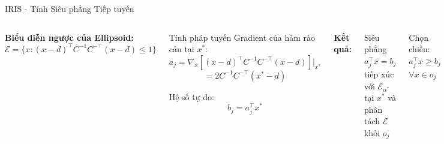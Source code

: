 \documentclass[aspectratio=169]{beamer}
\begin{document}
\begin{frame}{IRIS - Tính Siêu phẳng Tiếp tuyến}
    \begin{columns}[c]
        
        \textbf{Biểu diễn ngược của Ellipsoid:}
        \[
            \mathcal{E} = \{x : (x-d)^\top C^{-1}C^{-\top}(x-d) \leq 1\}
        \]

        \vspace{0.5em}
        \begin{block}{Tính pháp tuyến}
            \small
            Gradient của hàm rào cản tại $x^*$:
            \[
                a_j = \nabla_x[(x-d)^\top C^{-1}C^{-\top}(x-d)]|_{x^*}
            \]
            \[
                = 2C^{-1}C^{-\top}(x^* - d)
            \]
            
            Hệ số tự do:
            \[
                b_j = a_j^\top x^*
            \]
        \end{block}

        
        \vspace{0.5em}
        \textbf{Kết quả:}
        
        Siêu phẳng $a_j^\top x = b_j$ tiếp xúc với $\mathcal{E}_{\alpha^*}$ tại $x^*$ và phân tách $\mathcal{E}$ khỏi $o_j$
        
        \vspace{0.3em}
        Chọn chiều: $a_j^\top x \geq b_j$ $\forall x \in o_j$
    \end{columns}
\end{frame}
\end{document}
